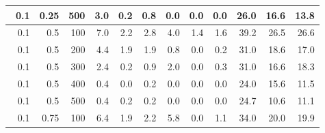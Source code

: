 \begin{longtable}{|r|r|r|r|r|r|r|r|r|r|r|r|}
    \hline \
    0.1                            & 0.25                     & 500                       & 3.0                       & 0.2                       & 0.8                       & 0.0                       & 0.0                       & 0.0                       & 26.0                      & 16.6                      & 13.8                      \\
    \hline \
    0.1                            & 0.5                     & 100                       & 7.0                       & 2.2                       & 2.8                       & 4.0                       & 1.4                       & 1.6                       & 39.2                      & 26.5                      & 26.6                      \\
    \hline \
    0.1                            & 0.5                     & 200                       & 4.4                       & 1.9                       & 1.9                       & 0.8                       & 0.0                       & 0.2                       & 31.0                      & 18.6                      & 17.0                      \\
    \hline \
    0.1                            & 0.5                     & 300                       & 2.4                       & 0.2                       & 0.9                       & 2.0                       & 0.0                       & 0.3                       & 31.0                      & 16.6                      & 18.3                      \\
    \hline \
    0.1                            & 0.5                    & 400                       & 0.4                       & 0.0                       & 0.2                       & 0.0                       & 0.0                       & 0.0                       & 24.0                      & 15.6                      & 11.5                      \\
    \hline \
    0.1                            & 0.5                    & 500                       & 0.4                       & 0.2                       & 0.2                       & 0.0                       & 0.0                       & 0.0                       & 24.7                      & 10.6                      & 11.1                      \\
    \hline \
    0.1                            & 0.75                    & 100                       & 6.4                       & 1.9                       & 2.2                       & 5.8                       & 0.0                       & 1.1                       & 34.0                      & 20.0                      & 19.9                      \\

\end{longtable}

